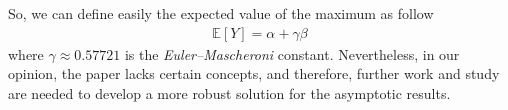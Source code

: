 

So, we can define easily the expected value of the maximum as follow
\begin{align*}
	\mathbb{E}[Y] = \alpha + \gamma \beta
\end{align*}
where $\gamma \approx 0.57721$ is the \textit{Euler–Mascheroni} constant. Nevertheless, in our opinion, the paper lacks certain concepts, and therefore, further work and study are needed to develop a more robust solution for the asymptotic results.

